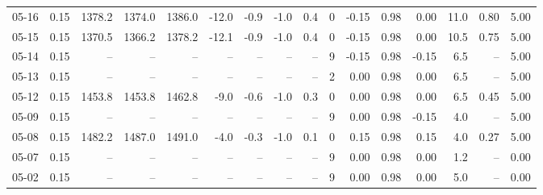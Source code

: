 \begin{threeparttable}
{\begin{tabular}{lrrrrrrrrrrrrrrr}
  05-16 &     0.15 & 1378.2 & 1374.0 & 1386.0 &      -12.0 &           -0.9 &                     -1.0 &                 0.4 &              0 &      -0.15 &      0.98 &           0.00 &             11.0 &            0.80 &                   5.00 \\
  05-15 &     0.15 & 1370.5 & 1366.2 & 1378.2 &      -12.1 &           -0.9 &                     -1.0 &                 0.4 &              0 &      -0.15 &      0.98 &           0.00 &             10.5 &            0.75 &                   5.00 \\
  05-14 &     0.15 &     -- &     -- &     -- &         -- &             -- &                       -- &                  -- &              9 &      -0.15 &      0.98 &          -0.15 &              6.5 &              -- &                   5.00 \\
  05-13 &     0.15 &     -- &     -- &     -- &         -- &             -- &                       -- &                  -- &              2 &       0.00 &      0.98 &           0.00 &              6.5 &              -- &                   5.00 \\
  05-12 &     0.15 & 1453.8 & 1453.8 & 1462.8 &       -9.0 &           -0.6 &                     -1.0 &                 0.3 &              0 &       0.00 &      0.98 &           0.00 &              6.5 &            0.45 &                   5.00 \\
  05-09 &     0.15 &     -- &     -- &     -- &         -- &             -- &                       -- &                  -- &              9 &       0.00 &      0.98 &          -0.15 &              4.0 &              -- &                   5.00 \\
  05-08 &     0.15 & 1482.2 & 1487.0 & 1491.0 &       -4.0 &           -0.3 &                     -1.0 &                 0.1 &              0 &       0.15 &      0.98 &           0.15 &              4.0 &            0.27 &                   5.00 \\
  05-07 &     0.15 &     -- &     -- &     -- &         -- &             -- &                       -- &                  -- &              9 &       0.00 &      0.98 &           0.00 &              1.2 &              -- &                   0.00 \\
  05-02 &     0.15 &     -- &     -- &     -- &         -- &             -- &                       -- &                  -- &              9 &       0.00 &      0.98 &           0.00 &              5.0 &              -- &                   0.00 \\

\end{tabular}}
\end{threeparttable}
